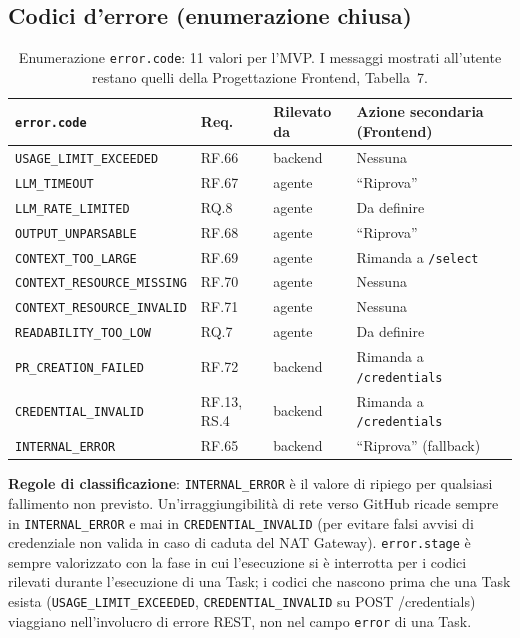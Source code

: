\documentclass[11pt,a4paper]{article}
\begin{document}
\subsection{Codici d'errore (enumerazione chiusa)}
\label{sec:be-codici-errore}

\begin{table}[H]
\centering
\caption{Enumerazione \texttt{error.code}: 11 valori per l'MVP. I messaggi mostrati all'utente restano quelli della Progettazione Frontend, Tabella~7.}
\label{tab:be-error-codes}
\vspace{2mm}
\renewcommand{\arraystretch}{1.2}
\begin{tabularx}{\textwidth}{|l|l|l|X|}
\hline
\textbf{\texttt{error.code}} & \textbf{Req.} & \textbf{Rilevato da} & \textbf{Azione secondaria (Frontend)} \\ \hline
\texttt{USAGE\_LIMIT\_EXCEEDED} & RF.66 & backend & Nessuna \\ \hline
\texttt{LLM\_TIMEOUT} & RF.67 & agente & ``Riprova'' \\ \hline
\texttt{LLM\_RATE\_LIMITED} & RQ.8 & agente & Da definire \\ \hline
\texttt{OUTPUT\_UNPARSABLE} & RF.68 & agente & ``Riprova'' \\ \hline
\texttt{CONTEXT\_TOO\_LARGE} & RF.69 & agente & Rimanda a \texttt{/select} \\ \hline
\texttt{CONTEXT\_RESOURCE\_MISSING} & RF.70 & agente & Nessuna \\ \hline
\texttt{CONTEXT\_RESOURCE\_INVALID} & RF.71 & agente & Nessuna \\ \hline
\texttt{READABILITY\_TOO\_LOW} & RQ.7 & agente & Da definire \\ \hline
\texttt{PR\_CREATION\_FAILED} & RF.72 & backend & Rimanda a \texttt{/credentials} \\ \hline
\texttt{CREDENTIAL\_INVALID} & RF.13, RS.4 & backend & Rimanda a \texttt{/credentials} \\ \hline
\texttt{INTERNAL\_ERROR} & RF.65 & backend & ``Riprova'' (fallback) \\ \hline
\end{tabularx}
\end{table}

\textbf{Regole di classificazione}: \texttt{INTERNAL\_ERROR} è il valore di ripiego per qualsiasi fallimento non previsto. Un'irraggiungibilità di rete verso GitHub ricade sempre in \texttt{INTERNAL\_ERROR} e mai in \texttt{CREDENTIAL\_INVALID} (per evitare falsi avvisi di credenziale non valida in caso di caduta del NAT Gateway). \texttt{error.stage} è sempre valorizzato con la fase in cui l'esecuzione si è interrotta per i codici rilevati durante l'esecuzione di una Task; i codici che nascono prima che una Task esista (\texttt{USAGE\_LIMIT\_EXCEEDED}, \texttt{CREDENTIAL\_INVALID} su POST /credentials) viaggiano nell'involucro di errore REST, non nel campo \texttt{error} di una Task.
\end{document}
